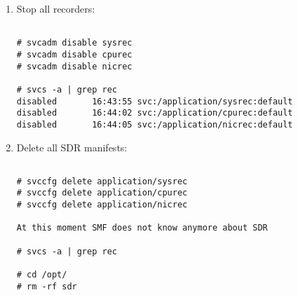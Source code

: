 \begin{enumerate}

\item Stop all recorders:
\begin{Verbatim}[fontsize=\relsize{-2},frame=single,
                 label=\fbox{SDR Uninstall procedure},
                 framesep=3mm,labelposition=bottomline]

# svcadm disable sysrec
# svcadm disable cpurec                            
# svcadm disable nicrec                            

# svcs -a | grep rec
disabled       16:43:55 svc:/application/sysrec:default
disabled       16:44:02 svc:/application/cpurec:default
disabled       16:44:05 svc:/application/nicrec:default

\end{Verbatim}


\item Delete all SDR manifests:
\begin{Verbatim}[fontsize=\relsize{-2},frame=single,
                 label=\fbox{Removal SMF manifests},
                 framesep=3mm,labelposition=bottomline]

# svccfg delete application/sysrec
# svccfg delete application/cpurec                 
# svccfg delete application/nicrec                 

At this moment SMF does not know anymore about SDR

# svcs -a | grep rec

# cd /opt/
# rm -rf sdr

\end{Verbatim}
\end{enumerate}


\endinput
